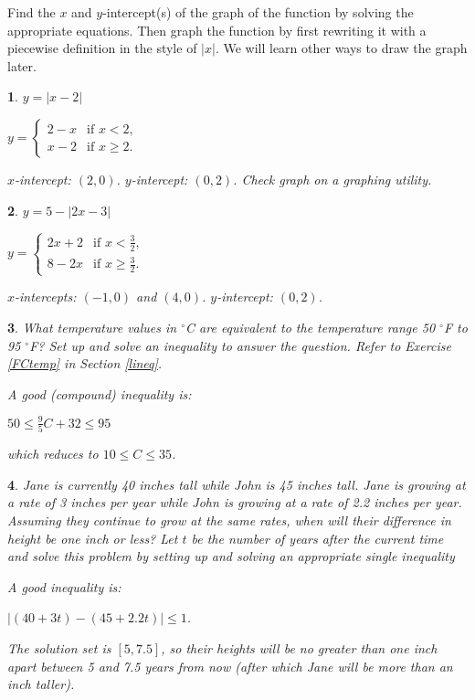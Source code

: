 \documentclass{amsbook}
\newtheorem{exc}{}
\newenvironment{ex}{\begin{exc}\normalfont}{\end{exc}}
\numberwithin{section}{chapter}
\numberwithin{equation}{chapter}
\newcommand{\ds}{\displaystyle}
\begin{document}
Find the $x$ and $y$-intercept(s) of the graph of the function by solving the appropriate equations. Then graph the function by first rewriting it with a piecewise definition in the style of $|x|$. We will learn other ways to draw the graph later.

\begin{multicols}{2}
\begin{ex}
	$y=|x-2|$
	\begin{sol}
		$\ds{y = \begin{cases} 
			2-x & \text{if } x< 2, \\
			x-2 & \text{if } x \geq 2. 
			\end{cases}  }$
		
		$x$-intercept: $(2,0)$. $y$-intercept: $(0,2)$. Check graph on a graphing utility.
	\end{sol}
\end{ex}

\begin{ex}
	$y=5-|2x-3|$
	\begin{sol}
		$\ds{y = \begin{cases} 
			2x+2 & \text{if } x< \frac{3}{2}, \\
			8-2x & \text{if } x \geq \frac{3}{2}. 
			\end{cases}  }$
		
		$x$-intercepts: $(-1,0)$ and $(4,0)$. $y$-intercept: $(0,2)$.
	\end{sol}
\end{ex}
\end{multicols}

\begin{ex}
What temperature values in $^\circ$C are equivalent to the temperature range 50 $^\circ$F to 95 $^\circ$F? Set up and solve an inequality to answer the question. Refer to Exercise \ref{FCtemp} in Section \ref{lineq}.
\begin{sol}
	A good (compound) inequality is:
	
	$50 \leq \frac{9}{5}C + 32 \leq 95$
	
	which reduces to $10 \leq C \leq 35$.
\end{sol}
\end{ex}


\begin{ex}
	Jane is currently 40 inches tall while John is 45 inches tall. Jane is growing at a rate of 3 inches per year while John is growing at a rate of 2.2 inches per year. Assuming they continue to grow at the same rates, when will their difference in height be one inch or less? Let $t$ be the number of years after the current time and solve this problem by setting up and solving an appropriate \textit{single} inequality
	\begin{sol}
		A good inequality is:
		
		$|(40+3t)-(45+2.2t)| \leq 1$.
		
		The solution set is $[5, 7.5]$, so their heights will be no greater than one inch apart between 5 and 7.5 years from now (after which Jane will be more than an inch taller).
	\end{sol}
\end{ex}
\end{document}
